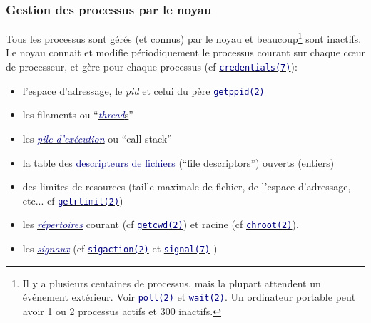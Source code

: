 \documentclass[lualatex,11pt,a4paper,svgnames,french]{beamer}
\begin{document}
\begin{frame}\frametitle{Gestion des processus par le noyau}
  \begin{relsize}{-0.5}
  Tous les processus sont gérés (et connus) par le noyau et
  beaucoup\footnote{Il y a plusieurs centaines de processus, mais la
  plupart attendent un événement extérieur. Voir
  \href{https://man7.org/linux/man-pages/man2/poll.2.html}{\texttt{\textcolor{Navy}{poll(2)}}}
  et
  \href{https://man7.org/linux/man-pages/man2/wait.2.html}{\texttt{\textcolor{Navy}{wait(2)}}}. Un
  ordinateur portable peut avoir 1 ou 2 processus actifs et 300
  inactifs.}  sont inactifs. Le noyau connait et modifie
  périodiquement le processus courant sur chaque c{\oe}ur de
  processeur, et gère pour chaque processus (cf 
  \href{https://man7.org/linux/man-pages/man7/credentials.7.html}{\texttt{\textcolor{Navy}{credentials(7)}}}):
  \end{relsize}

  \begin{relsize}{-1}
  \begin{itemize}
  \item l'espace d'adressage, le \textit{pid} et celui du père
    \href{https://man7.org/linux/man-pages/man2/getppid.2.html}{\texttt{\textcolor{Navy}{getppid(2)}}}
    \item les filaments ou 
      ``{\href{https://fr.wikipedia.org/wiki/Thread_(informatique)}{\textit{\textcolor{Navy}{thread}}s}}''
    \item les
      {\href{https://fr.wikipedia.org/wiki/Pile_d'exécution}{\textit{\textcolor{Navy}{pile
              d'exécution}}}} ou ``call stack''
  \item la table des
    \href{https://fr.wikipedia.org/wiki/Descripteur_de_fichier}{\textcolor{Navy}{descripteurs
        de fichiers}} (``file descriptors'') ouverts (entiers)
  \item des limites de resources (taille maximale de fichier, de l'espace d'adressage, etc... cf
    \href{https://man7.org/linux/man-pages/man2/getrlimit.2.html}{\texttt{\textcolor{Navy}{getrlimit(2)}}})
    \item les 
    \href{https://fr.wikipedia.org/wiki/Répertoire_(informatique)}{\textcolor{Navy}{\textit{répertoires}}} courant (cf
    \href{https://man7.org/linux/man-pages/man2/getcwd.2.html}{\texttt{\textcolor{Navy}{getcwd(2)}}}) et racine (cf
    \href{https://man7.org/linux/man-pages/man2/chroot.2.html}{\texttt{\textcolor{Navy}{chroot(2)}}}).
    \item les \href{https://fr.wikipedia.org/wiki/Signal_(informatique)}{\textcolor{Navy}{\textit{signaux}}} (cf
      \href{https://man7.org/linux/man-pages/man2/sigaction.2.html}{\texttt{\textcolor{Navy}{sigaction(2)}}}
      et
      \href{https://man7.org/linux/man-pages/man7/signal.7.html}{\texttt{\textcolor{Navy}{signal(7)}}}
      )
  \end{itemize}
  \end{relsize}
\end{frame}
\end{document}
